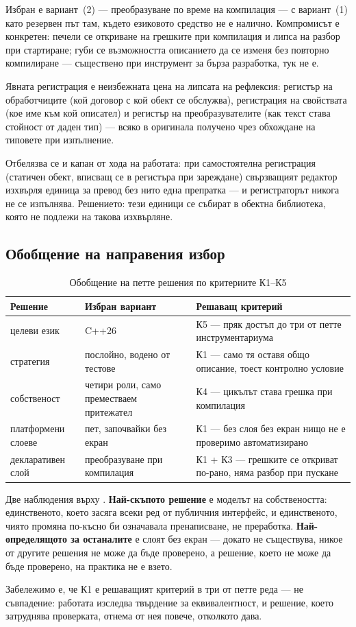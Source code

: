 Избран е вариант~(2) --- преобразуване по време на компилация --- с вариант~(1) като
резервен път там, където езиковото средство не е налично. Компромисът е конкретен: печели
се откриване на грешките при компилация и липса на разбор при стартиране; губи се
възможността описанието да се изменя без повторно компилиране --- съществено при инструмент
за бърза разработка, тук не е.

Явната регистрация е неизбежната цена на липсата на рефлексия: регистър на обработчиците
(кой договор с кой обект се обслужва), регистрация на свойствата (кое име към кой
описател) и регистър на преобразувателите (как текст става стойност от даден тип) --- всяко
в оригинала получено чрез обхождане на типовете при изпълнение.

Отбелязва се и капан от хода на работата: при самостоятелна регистрация (статичен обект,
вписващ се в регистъра при зареждане) свързващият редактор изхвърля единица за превод без
нито една препратка --- и регистраторът никога не се изпълнява. Решението: тези единици се
събират в обектна библиотека, която не подлежи на такова изхвърляне.

\subsection{Обобщение на направения избор}
\label{subsec:choice_summary}

\begin{table}[H]
\caption{Обобщение на петте решения по критериите К1--К5}
\label{tab:decisions}
\centering\small
\begin{tabular}{@{}L{3.4cm}L{4.6cm}L{6.0cm}@{}}
\hline
\textbf{Решение} & \textbf{Избран вариант} & \textbf{Решаващ критерий} \\
\hline
целеви език & C++26 & К5 --- пряк достъп до три от петте инструментариума \\
стратегия & послойно, водено от тестове & К1 --- само тя оставя общо описание, тоест контролно условие \\
собственост & четири роли, само преместваем притежател & К4 --- цикълът става грешка при компилация \\
платформени слоеве & пет, започвайки без екран & К1 --- без слоя без екран нищо не е проверимо автоматизирано \\
декларативен слой & преобразуване при компилация & К1 + К3 --- грешките се откриват по-рано, няма разбор при пускане \\
\hline
\end{tabular}
\end{table}

Две наблюдения върху . \textbf{Най-скъпото решение} е моделът на
собствеността: единственото, което засяга всеки ред от публичния интерфейс, и
единственото, чиято промяна по-късно би означавала пренаписване, не преработка.
\textbf{Най-определящото за останалите} е слоят без екран --- докато не съществува, никое
от другите решения не може да бъде проверено, а решение, което не може да бъде проверено,
на практика не е взето.

Забележимо е, че К1 е решаващият критерий в три от петте реда --- не съвпадение: работата
изследва твърдение за еквивалентност, и решение, което затруднява проверката, отнема от нея
повече, отколкото дава.
